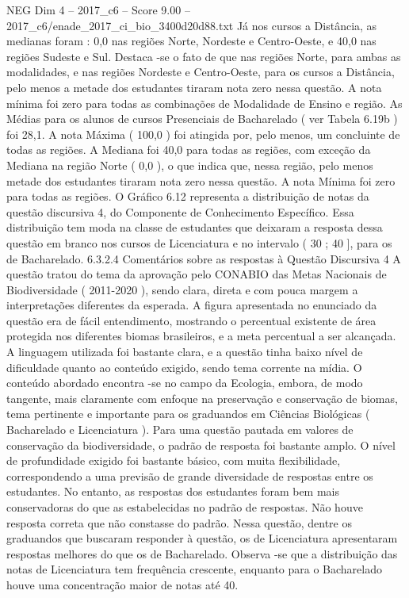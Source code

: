 \begin{textsample}{NEG Dim 4 – 2017\_c6 – Score 9.00 – 2017\_c6/enade\_2017\_ci\_bio\_3400d20d88.txt}
Já nos cursos a Distância, as medianas foram : 0,0 nas regiões Norte, Nordeste e Centro-Oeste, e 40,0 nas regiões Sudeste e Sul.
Destaca -se o fato de que nas regiões Norte, para ambas as modalidades, e nas regiões Nordeste e Centro-Oeste, para os cursos a Distância, pelo menos a metade dos estudantes tiraram nota zero nessa questão.
A nota mínima foi zero para todas as combinações de Modalidade de Ensino e região.
As Médias para os alunos de cursos Presenciais de Bacharelado ( ver Tabela 6.19b ) foi 28,1.
A nota Máxima ( 100,0 ) foi atingida por, pelo menos, um concluinte de todas as regiões.
A Mediana foi 40,0 para todas as regiões, com exceção da Mediana na região Norte ( 0,0 ), o que indica que, nessa região, pelo menos metade dos estudantes tiraram nota zero nessa questão.
A nota Mínima foi zero para todas as regiões.
O Gráfico 6.12 representa a distribuição de notas da questão discursiva 4, do Componente de Conhecimento Específico.
Essa distribuição tem moda na classe de estudantes que deixaram a resposta dessa questão em branco nos cursos de Licenciatura e no intervalo ( 30 ; 40 ], para os de Bacharelado. 6.3.2.4 Comentários sobre as respostas à Questão Discursiva 4 A questão tratou do tema da aprovação pelo CONABIO das Metas Nacionais de Biodiversidade ( 2011-2020 ), sendo clara, direta e com pouca margem a interpretações diferentes da esperada.
A figura apresentada no enunciado da questão era de fácil entendimento, mostrando o percentual existente de área protegida nos diferentes biomas brasileiros, e a meta percentual a ser alcançada.
A linguagem utilizada foi bastante clara, e a questão tinha baixo nível de dificuldade quanto ao conteúdo exigido, sendo tema corrente na mídia.
O conteúdo abordado encontra -se no campo da Ecologia, embora, de modo tangente, mais claramente com enfoque na preservação e conservação de biomas, tema pertinente e importante para os graduandos em Ciências Biológicas ( Bacharelado e Licenciatura ).
Para uma questão pautada em valores de conservação da biodiversidade, o padrão de resposta foi bastante amplo.
O nível de profundidade exigido foi bastante básico, com muita flexibilidade, correspondendo a uma previsão de grande diversidade de respostas entre os estudantes.
No entanto, as respostas dos estudantes foram bem mais conservadoras do que as estabelecidas no padrão de respostas.
Não houve resposta correta que não constasse do padrão.
Nessa questão, dentre os graduandos que buscaram responder à questão, os de Licenciatura apresentaram respostas melhores do que os de Bacharelado.
Observa -se que a distribuição das notas de Licenciatura tem frequência crescente, enquanto para o Bacharelado houve uma concentração maior de notas até 40.

\end{textsample}
